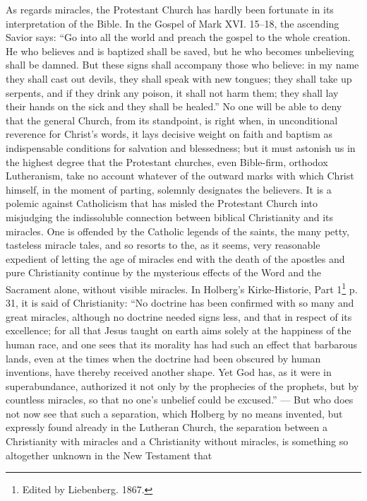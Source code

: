 \documentclass[12pt,a4paper]{article}
\newcommand{\opage}[1]{\marginnote{\footnotesize\textit{[#1]}}}
\begin{document}
\opage{14}As regards miracles, the Protestant Church has
hardly been fortunate in its interpretation of the Bible. In the Gospel of
Mark XVI. 15--18, the ascending Savior says: ``Go
into all the world and preach the gospel to the whole creation. He who
believes and is baptized shall be saved, but he who
becomes unbelieving shall be damned. But these signs shall
accompany those who believe: in my name they shall cast out devils, they
shall speak with new tongues; they shall take up serpents, and if
they drink any poison, it shall not harm them; they shall
lay their hands on the sick and they shall be healed.'' No one
will be able to deny that the general Church, from its standpoint, is
right when, in unconditional reverence for Christ's words, it lays decisive
weight on faith and baptism as indispensable conditions
for salvation and blessedness; but it must astonish us in the highest degree
that the Protestant churches, even Bible-firm, orthodox Lutheranism,
take no account whatever of the outward marks with which
Christ himself, in the moment of parting, solemnly designates the believers.
It is a polemic against Catholicism that has misled
the Protestant Church into misjudging the indissoluble connection
between biblical Christianity and its miracles. One
is offended by the Catholic legends of the saints, the many petty, tasteless
miracle tales, and so resorts to the, as it seems, very
reasonable expedient of letting the age of miracles end with the death of the apostles
and pure Christianity continue by the mysterious effects of the Word and the Sacrament
alone, without visible miracles.
In Holberg's Kirke-Historie, Part 1\footnote{Edited by Liebenberg. 1867.} %
p. 31, it is said of Christianity: ``No doctrine has been confirmed with so many
and great miracles, although no doctrine needed signs less,
and that in respect of its excellence; for all that Jesus taught
on earth aims solely at the happiness of the human race,
and one sees that its morality has had such an effect that barbarous
lands, even at the times when the doctrine had been obscured by human
inventions, have thereby received another
\opage{15}shape. Yet God has, as it were in superabundance, authorized it
not only by the prophecies of the prophets, but by countless miracles,
so that no one's unbelief could be excused.'' --- But who does not now
see that such a separation, which Holberg by no means
invented, but expressly found already in the Lutheran Church, the separation
between a Christianity with miracles and a Christianity without
miracles, is something so altogether unknown in the New Testament that
\end{document}
